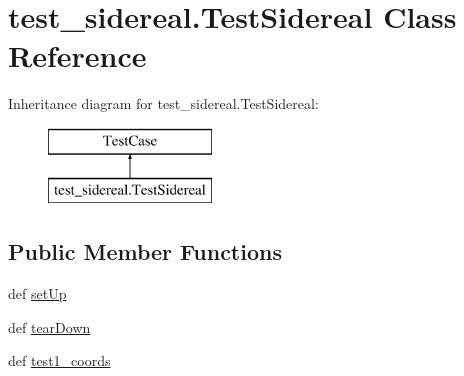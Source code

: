 \hypertarget{classtest__sidereal_1_1_test_sidereal}{\section{test\-\_\-sidereal.\-Test\-Sidereal Class Reference}
\label{classtest__sidereal_1_1_test_sidereal}
}
Inheritance diagram for test\-\_\-sidereal.\-Test\-Sidereal\-:\begin{figure}[H]
\begin{center}
\leavevmode
\includegraphics[height=2.000000cm]{classtest__sidereal_1_1_test_sidereal}
\end{center}
\end{figure}
\subsection*{Public Member Functions}
\begin{DoxyCompactItemize}
\item 
def \hyperlink{classtest__sidereal_1_1_test_sidereal_a63b312fe76d9023b2b0cf40045929e90}{set\-Up}
\item 
def \hyperlink{classtest__sidereal_1_1_test_sidereal_a1a26249915d94355c6ea0a21d917a96b}{tear\-Down}
\item 
def \hyperlink{classtest__sidereal_1_1_test_sidereal_adbdd8a1fa36785c878bddea37ad5b8ec}{test1\-\_\-coords}
\end{DoxyCompactItemize}


